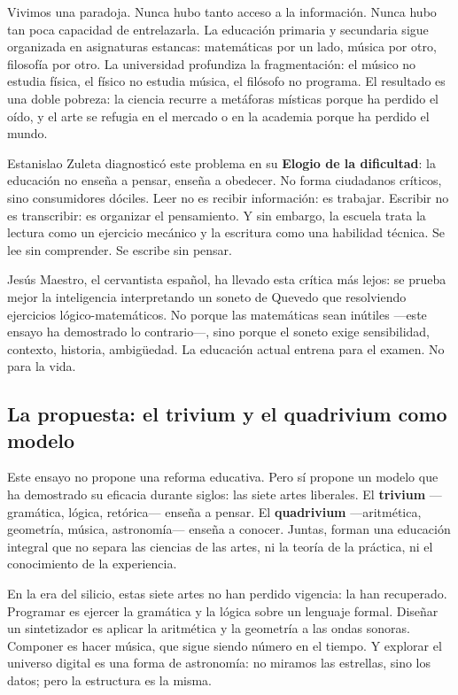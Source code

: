 \documentclass[14pt, a4paper]{article}
\begin{document}
Vivimos una paradoja. Nunca hubo tanto acceso a la información. Nunca
hubo tan poca capacidad de entrelazarla. La educación primaria y
secundaria sigue organizada en asignaturas estancas: matemáticas por
un lado, música por otro, filosofía por otro. La universidad
profundiza la fragmentación: el músico no estudia física, el físico no
estudia música, el filósofo no programa. El resultado es una doble
pobreza: la ciencia recurre a metáforas místicas porque ha perdido el
oído, y el arte se refugia en el mercado o en la academia porque ha
perdido el mundo.

Estanislao Zuleta diagnosticó este problema en su \textbf{Elogio de la
dificultad}: la educación no enseña a pensar, enseña a obedecer. No
forma ciudadanos críticos, sino consumidores dóciles. Leer no es
recibir información: es trabajar. Escribir no es transcribir: es
organizar el pensamiento. Y sin embargo, la escuela trata la lectura
como un ejercicio mecánico y la escritura como una habilidad técnica.
Se lee sin comprender. Se escribe sin pensar.

Jesús Maestro, el cervantista español, ha llevado esta crítica más
lejos: se prueba mejor la inteligencia interpretando un soneto de
Quevedo que resolviendo ejercicios lógico-matemáticos. No porque las
matemáticas sean inútiles —este ensayo ha demostrado lo contrario—,
sino porque el soneto exige sensibilidad, contexto, historia,
ambigüedad. La educación actual entrena para el examen. No para la
vida.
\subsection{La propuesta: el \textbf{trivium} y el \textbf{quadrivium} como modelo}
\label{sec:orga126adf}

Este ensayo no propone una reforma educativa. Pero sí propone un
modelo que ha demostrado su eficacia durante siglos: las siete artes
liberales. El \textbf{trivium} —gramática, lógica, retórica— enseña a pensar.
El \textbf{quadrivium} —aritmética, geometría, música, astronomía— enseña a
conocer. Juntas, forman una educación integral que no separa las
ciencias de las artes, ni la teoría de la práctica, ni el conocimiento
de la experiencia.

En la era del silicio, estas siete artes no han perdido vigencia: la
han recuperado. Programar es ejercer la gramática y la lógica sobre un
lenguaje formal. Diseñar un sintetizador es aplicar la aritmética y la
geometría a las ondas sonoras. Componer es hacer música, que sigue
siendo número en el tiempo. Y explorar el universo digital es una
forma de astronomía: no miramos las estrellas, sino los datos; pero la
estructura es la misma.
\end{document}
